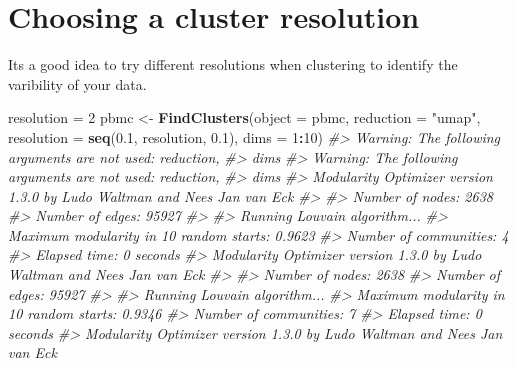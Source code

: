 \documentclass[
]{book}
\newenvironment{Shaded}{\begin{snugshade}}{\end{snugshade}}
\newcommand{\AttributeTok}[1]{\textcolor[rgb]{0.13,0.29,0.53}{#1}}
\newcommand{\CommentTok}[1]{\textcolor[rgb]{0.56,0.35,0.01}{\textit{#1}}}
\newcommand{\DecValTok}[1]{\textcolor[rgb]{0.00,0.00,0.81}{#1}}
\newcommand{\FloatTok}[1]{\textcolor[rgb]{0.00,0.00,0.81}{#1}}
\newcommand{\FunctionTok}[1]{\textcolor[rgb]{0.13,0.29,0.53}{\textbf{#1}}}
\newcommand{\NormalTok}[1]{#1}
\newcommand{\OtherTok}[1]{\textcolor[rgb]{0.56,0.35,0.01}{#1}}
\newcommand{\SpecialCharTok}[1]{\textcolor[rgb]{0.81,0.36,0.00}{\textbf{#1}}}
\newcommand{\StringTok}[1]{\textcolor[rgb]{0.31,0.60,0.02}{#1}}
\begin{document}
\subsubsection*{}\label{section-9}

\section{Choosing a cluster resolution}\label{choosing-a-cluster-resolution}

Its a good idea to try different resolutions when clustering to identify the varibility of your data.

\begin{Shaded}
\begin{Highlighting}[]
\NormalTok{resolution }\OtherTok{=} \DecValTok{2}
\NormalTok{pbmc }\OtherTok{\textless{}{-}} \FunctionTok{FindClusters}\NormalTok{(}\AttributeTok{object =}\NormalTok{ pbmc, }\AttributeTok{reduction =} \StringTok{"umap"}\NormalTok{, }\AttributeTok{resolution =} \FunctionTok{seq}\NormalTok{(}\FloatTok{0.1}\NormalTok{, resolution, }\FloatTok{0.1}\NormalTok{),}
    \AttributeTok{dims =} \DecValTok{1}\SpecialCharTok{:}\DecValTok{10}\NormalTok{)}
\CommentTok{\#\textgreater{} Warning: The following arguments are not used: reduction,}
\CommentTok{\#\textgreater{} dims}
\CommentTok{\#\textgreater{} Warning: The following arguments are not used: reduction,}
\CommentTok{\#\textgreater{} dims}
\CommentTok{\#\textgreater{} Modularity Optimizer version 1.3.0 by Ludo Waltman and Nees Jan van Eck}
\CommentTok{\#\textgreater{} }
\CommentTok{\#\textgreater{} Number of nodes: 2638}
\CommentTok{\#\textgreater{} Number of edges: 95927}
\CommentTok{\#\textgreater{} }
\CommentTok{\#\textgreater{} Running Louvain algorithm...}
\CommentTok{\#\textgreater{} Maximum modularity in 10 random starts: 0.9623}
\CommentTok{\#\textgreater{} Number of communities: 4}
\CommentTok{\#\textgreater{} Elapsed time: 0 seconds}
\CommentTok{\#\textgreater{} Modularity Optimizer version 1.3.0 by Ludo Waltman and Nees Jan van Eck}
\CommentTok{\#\textgreater{} }
\CommentTok{\#\textgreater{} Number of nodes: 2638}
\CommentTok{\#\textgreater{} Number of edges: 95927}
\CommentTok{\#\textgreater{} }
\CommentTok{\#\textgreater{} Running Louvain algorithm...}
\CommentTok{\#\textgreater{} Maximum modularity in 10 random starts: 0.9346}
\CommentTok{\#\textgreater{} Number of communities: 7}
\CommentTok{\#\textgreater{} Elapsed time: 0 seconds}
\CommentTok{\#\textgreater{} Modularity Optimizer version 1.3.0 by Ludo Waltman and Nees Jan van Eck}

\end{Highlighting}
\end{Shaded}
\end{document}
